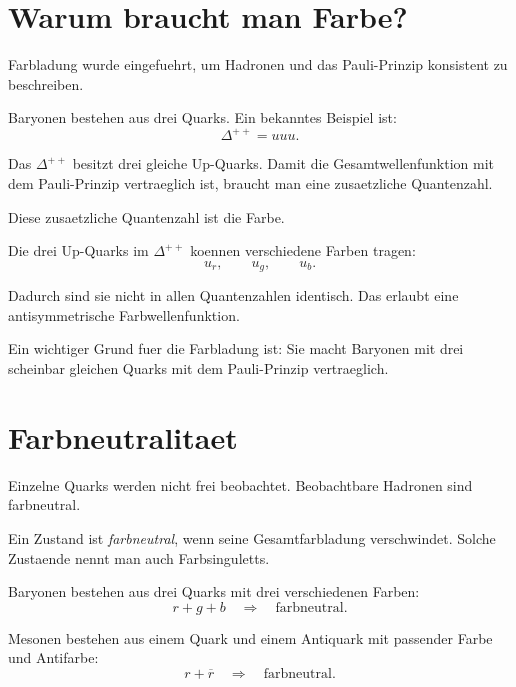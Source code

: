 \section{Warum braucht man Farbe?}

Farbladung wurde eingefuehrt, um Hadronen und das Pauli-Prinzip konsistent zu
beschreiben.

\begin{conceptbox}
Baryonen bestehen aus drei Quarks.
Ein bekanntes Beispiel ist:
\[
    \Delta^{++}=uuu.
\]

Das $\Delta^{++}$ besitzt drei gleiche Up-Quarks.
Damit die Gesamtwellenfunktion mit dem Pauli-Prinzip vertraeglich ist, braucht man
eine zusaetzliche Quantenzahl.

Diese zusaetzliche Quantenzahl ist die Farbe.
\end{conceptbox}

\begin{conceptbox}
Die drei Up-Quarks im $\Delta^{++}$ koennen verschiedene Farben tragen:
\[
    u_r,\qquad u_g,\qquad u_b.
\]

Dadurch sind sie nicht in allen Quantenzahlen identisch.
Das erlaubt eine antisymmetrische Farbwellenfunktion.
\end{conceptbox}

\begin{examtipbox}
Ein wichtiger Grund fuer die Farbladung ist:
Sie macht Baryonen mit drei scheinbar gleichen Quarks mit dem Pauli-Prinzip
vertraeglich.
\end{examtipbox}

\section{Farbneutralitaet}

Einzelne Quarks werden nicht frei beobachtet.
Beobachtbare Hadronen sind farbneutral.

\begin{definitionbox}
Ein Zustand ist \emph{farbneutral}, wenn seine Gesamtfarbladung verschwindet.
Solche Zustaende nennt man auch Farbsinguletts.
\end{definitionbox}

\begin{conceptbox}
Baryonen bestehen aus drei Quarks mit drei verschiedenen Farben:
\[
    r+g+b
    \quad\Rightarrow\quad
    \text{farbneutral}.
\]

Mesonen bestehen aus einem Quark und einem Antiquark mit passender Farbe und
Antifarbe:
\[
    r+\overline{r}
    \quad\Rightarrow\quad
    \text{farbneutral}.
\]
\end{conceptbox}

